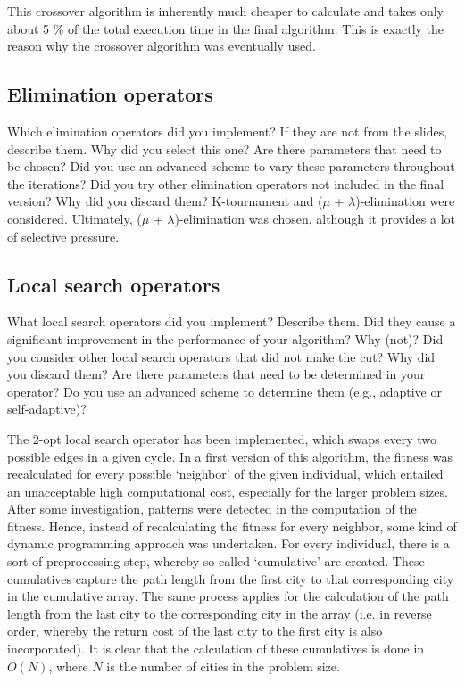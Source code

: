\documentclass[a4paper,10pt]{article}
\newcommand{\ReplaceMe}[1]{{\color{blue}#1}}
\begin{document}
This crossover algorithm is inherently much cheaper to calculate and takes only about 5 \% of the total execution time in the final algorithm. This is exactly the reason why the crossover algorithm was eventually used. 

\subsection{Elimination operators}
\label{elimination}
\ReplaceMe{Which elimination operators did you implement? If they are not from the slides, describe them. Why did you select this one? Are there parameters that need to be chosen? Did you use an advanced scheme to vary these parameters throughout the iterations? Did you try other elimination operators not included in the final version? Why did you discard them?}
K-tournament and ($ \mu $ + $ \lambda $)-elimination were considered. Ultimately, ($ \mu $ + $ \lambda $)-elimination was chosen, although it provides a lot of selective pressure. %

\subsection{Local search operators}
\label{local_search_operator}
\ReplaceMe{What local search operators did you implement? Describe them. Did they cause a significant improvement in the performance of your algorithm? Why (not)? Did you consider other local search operators that did not make the cut? Why did you discard them? Are there parameters that need to be determined in your operator? Do you use an advanced scheme to determine them (e.g., adaptive or self-adaptive)?}

The 2-opt local search operator has been implemented, which swaps every two possible edges in a given cycle. In a first version of this algorithm, the fitness was recalculated for every possible `neighbor' of the given individual, which entailed an unacceptable high computational cost, especially for the larger problem sizes. After some investigation, patterns were detected in the computation of the fitness. Hence, instead of recalculating the fitness for every neighbor, some kind of dynamic programming approach was undertaken. For every individual, there is a sort of preprocessing step, whereby so-called `cumulative' are created. These cumulatives capture the path length from the first city to that corresponding city in the cumulative array. The same process applies for the calculation of the path length from the last city to the corresponding city in the array (i.e. in reverse order, whereby the return cost of the last city to the first city is also incorporated). It is clear that the calculation of these cumulatives is done in $O(N)$, where $N$ is the number of cities in the problem size.
\end{document}
